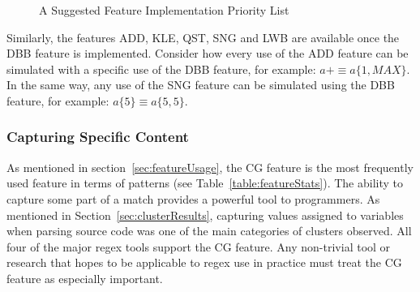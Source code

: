 \begin{figure}[tb]
\caption{A Suggested Feature Implementation Priority List \label{fig:prioritizedList}
}
\end{figure}


Similarly, the features ADD, KLE, QST, SNG and LWB are available once the DBB feature is implemented.  Consider how every use of the ADD feature can be simulated with a specific use of the DBB feature, for example: $a+ \equiv a\{1, MAX\}$.  In the same way, any use of the SNG feature can be simulated using the DBB feature, for example:  $a\{5\} \equiv a\{5, 5\}$.

\leavevmode\color{black}
\subsubsection{Capturing Specific Content}
As mentioned in section~\ref{sec:featureUsage}, the CG feature is the most frequently used feature in terms of patterns (see Table~\ref{table:featureStats}).  The ability to capture some part of a match provides a powerful tool to programmers.  As mentioned in Section~\ref{sec:clusterResults}, capturing values assigned to variables when parsing source code was one of the main categories of clusters observed.  All four of the major regex tools support the CG feature.  Any non-trivial tool or research that hopes to be applicable to regex use in practice must treat the CG feature as especially important.
\leavevmode\color{gray}
